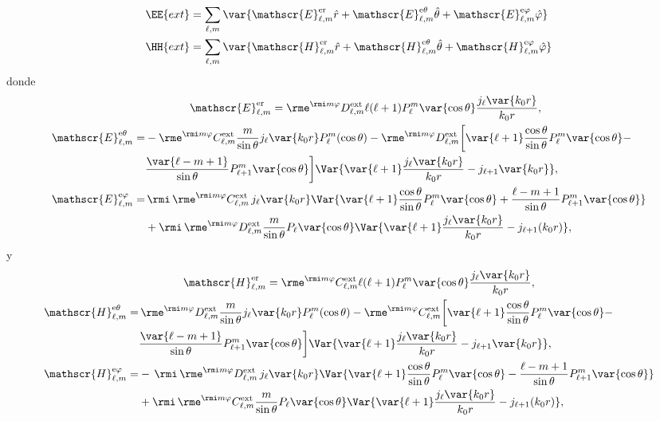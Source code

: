\begin{align}
\EE{ext} &= \sum_{\ell, m} \var{\mathscr{E}_{\ell, m}^{\text{er}}\hat{r} +\mathscr{E}_{\ell, m}^{\text{e}\theta}\hat{\theta} + \mathscr{E}_{\ell, m}^{\text{e}\varphi}\hat{\varphi}}\\
\HH{ext} &= \sum_{\ell, m} \var{\mathscr{H}_{\ell, m}^{\text{er}}\hat{r} +\mathscr{H}_{\ell, m}^{\text{e}\theta}\hat{\theta} + \mathscr{H}_{\ell, m}^{\text{e}\varphi}\hat{\varphi}}
\end{align}
donde
\begin{align}
& \qquad\qquad \mathscr{E}_{\ell, m}^{\text{er}}=\rme^{\rmi m \varphi} D_{\ell, m}^{\text{ext}} \ell (\ell +1 ) P_{\ell}^{m}\var{\cos\theta}\frac{j_{\ell}\var{k_0 r}}{k_0 r},\\
%
\mathscr{E}_{\ell, m}^{\text{e}\theta}=&-\rme^{\rmi m \varphi}C_{\ell, m}^{\text{ext}} \frac{m}{\sin\theta}j_{\ell}\var{k_0 r}P_{\ell}^{m}(\cos\theta)-\rme^{\rmi m \varphi}D_{\ell, m}^{\text{ext}}\bigg[ \var{\ell + 1}\frac{\cos\theta}{\sin\theta} P_{\ell}^{m}\var{\cos\theta}- \nonumber \\
&\frac{\var{\ell-m+1}}{\sin\theta}P_{\ell+1}^{m}\var{\cos\theta} \bigg] \Var{\var{\ell +1}\frac{j_{\ell}\var{k_0 r}}{k_0 r}-j_{\ell +1}\var{k_0 r}},\\
%
\mathscr{E}_{\ell, m}^{\text{e}\varphi}=& \,\rmi\, \rme^{\rmi m \varphi}C_{\ell, m}^{\text{ext}}\, j_{\ell}\var{k_0 r}\Var{\var{\ell +1}\frac{\cos\theta}{\sin\theta}P_{\ell}^{m}\var{\cos\theta}+\frac{\ell-m+1}{\sin\theta}P_{\ell +1}^{m}\var{\cos\theta}} \nonumber \\
&+\rmi\,\rme^{\rmi m \varphi}D_{\ell, m}^{\text{ext}}\frac{m}{\sin\theta}P_{\ell}\var{\cos\theta}\Var{\var{\ell +1}\frac{j_{\ell}\var{k_0 r}}{k_0 r}-j_{\ell + 1}(k_0 r)},
\end{align}
y
\begin{align}
& \qquad\qquad \mathscr{H}_{\ell, m}^{\text{er}}=\rme^{\rmi m \varphi} C_{\ell, m}^{\text{ext}} \ell (\ell +1 ) P_{\ell}^{m}\var{\cos\theta}\frac{j_{\ell}\var{k_0 r}}{k_0 r},\\
%
\mathscr{H}_{\ell, m}^{\text{e}\theta}=&\,\rme^{\rmi m \varphi}D_{\ell, m}^{\text{ext}} \frac{m}{\sin\theta}j_{\ell}\var{k_0 r}P_{\ell}^{m}(\cos\theta)-\rme^{\rmi m \varphi}C_{\ell, m}^{\text{ext}}\bigg[ \var{\ell + 1}\frac{\cos\theta}{\sin\theta} P_{\ell}^{m}\var{\cos\theta}- \nonumber \\
&\frac{\var{\ell-m+1}}{\sin\theta}P_{\ell+1}^{m}\var{\cos\theta} \bigg] \Var{\var{\ell +1}\frac{j_{\ell}\var{k_0 r}}{k_0 r}-j_{\ell +1}\var{k_0 r}},\\
%
\mathscr{H}_{\ell, m}^{\text{e}\varphi}=&- \,\rmi\, \rme^{\rmi m \varphi} D_{\ell, m}^{\text{ext}}\, j_{\ell}\var{k_0 r}\Var{\var{\ell +1}\frac{\cos\theta}{\sin\theta}P_{\ell}^{m}\var{\cos\theta}-\frac{\ell-m+1}{\sin\theta}P_{\ell +1}^{m}\var{\cos\theta}} \nonumber \\
&+\rmi\,\rme^{\rmi m \varphi}C_{\ell, m}^{\text{ext}}\frac{m}{\sin\theta}P_{\ell}\var{\cos\theta}\Var{\var{\ell +1}\frac{j_{\ell}\var{k_0 r}}{k_0 r}-j_{\ell + 1}(k_0 r)},
\end{align}
